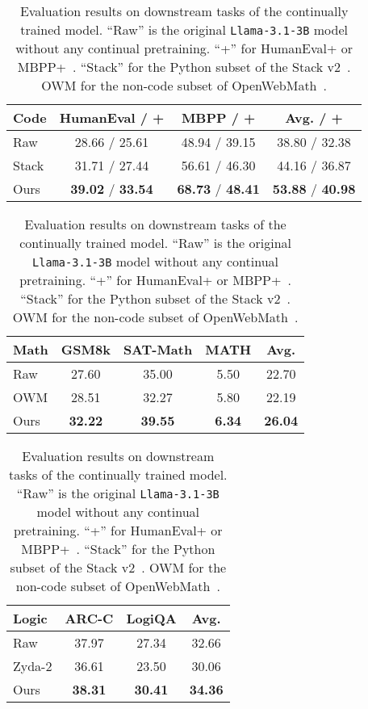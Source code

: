 \begin{table}[t]
    \centering
    \footnotesize
    \begin{tabularx}
        {0.97\linewidth} {l@{\hskip 9pt}c@{\hskip 9pt}c@{\hskip 9pt}c} \toprule \textbf{Code}
        & \textbf{HumanEval / +} & \textbf{MBPP / +} & \textbf{Avg. / +} \\ \midrule
        Raw & 28.66 / 25.61 & 48.94 / 39.15 & 38.80 / 32.38 \\ Stack & 31.71 / 27.44
        & 56.61 / 46.30 & 44.16 / 36.87 \\ Ours & \textbf{39.02} / \textbf{33.54}
        & \textbf{68.73} / \textbf{48.41} & \textbf{53.88} / \textbf{40.98} \\
    \end{tabularx}
    \begin{tabularx}
        {0.97\linewidth} {l@{\hskip 14pt}c@{\hskip 14pt}c@{\hskip 14pt}c@{\hskip 14pt}c}
        \midrule \textbf{Math} & \textbf{GSM8k} & \textbf{SAT-Math} & \textbf{MATH}
        & \textbf{Avg.} \\ \midrule Raw & 27.60 & 35.00 & 5.50 & 22.70 \\ OWM &
        28.51 & 32.27 & 5.80 & 22.19 \\ Ours & \textbf{32.22} & \textbf{39.55} &
        \textbf{6.34} & \textbf{26.04} \\
    \end{tabularx}
    \begin{tabularx}
        {0.97\linewidth} {l@{\hskip 28pt}c@{\hskip 28pt}c@{\hskip 28pt}c} \midrule
        \textbf{Logic} & \textbf{ARC-C} & \textbf{LogiQA} & \textbf{Avg.} \\ \midrule
        Raw & 37.97 & 27.34 & 32.66 \\ Zyda-2 & 36.61 & 23.50 & 30.06 \\ Ours & \textbf{38.31}
        & \textbf{30.41} & \textbf{34.36} \\ \bottomrule
    \end{tabularx}
    \caption{Evaluation results on downstream tasks of the continually trained
    model. ``Raw'' is the original \texttt{Llama-3.1-3B} model without any
    continual pretraining. ``+'' for HumanEval+ or MBPP+~\citep{liu_is_2023}. ``Stack''
    for the Python subset of the Stack v2~\citep{lozhkov_starcoder_2024}. OWM for
    the non-code subset of OpenWebMath~\citep{paster_openwebmath_2023}.}
    \label{tab:continual_pretraining}
\end{table}
